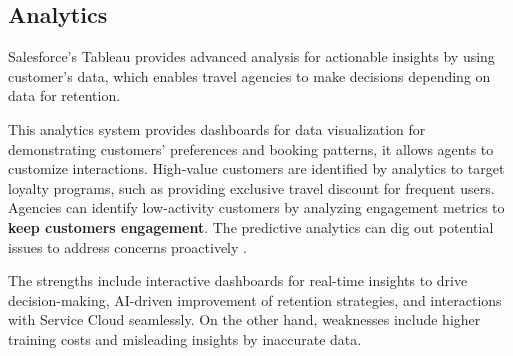 \subsection{Analytics}
Salesforce's Tableau provides advanced analysis for actionable insights by using customer's data, which enables travel agencies to make decisions depending on data for retention.

This analytics system provides dashboards for data visualization for demonstrating customers' preferences and booking patterns, it allows agents to customize interactions. High-value customers are identified by analytics to target loyalty programs, such as providing exclusive travel discount for frequent users. Agencies can identify low-activity customers by analyzing engagement metrics to \textbf{keep customers engagement}. The predictive analytics can dig out potential issues to address concerns proactively \cite{SalesforceTableau2025}. 

The strengths include interactive dashboards for real-time insights to drive decision-making, AI-driven improvement of retention strategies, and interactions with Service Cloud seamlessly. On the other hand, weaknesses include higher training costs and misleading insights by inaccurate data.